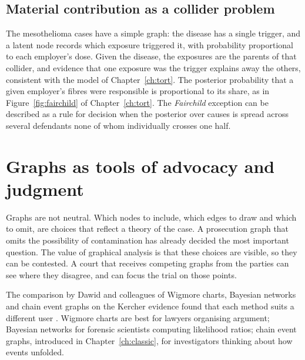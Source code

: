 \subsection{Material contribution as a collider problem}

The mesothelioma cases have a simple graph: the disease has a single trigger, and a latent node records which exposure triggered it, with probability proportional to each employer's dose. Given the disease, the exposures are the parents of that collider, and evidence that one exposure was the trigger explains away the others, consistent with the model of Chapter~\ref{ch:tort}. The posterior probability that a given employer's fibres were responsible is proportional to its share, as in Figure~\ref{fig:fairchild} of Chapter~\ref{ch:tort}. The \emph{Fairchild} exception can be described as a rule for decision when the posterior over causes is spread across several defendants none of whom individually crosses one half.

\section{Graphs as tools of advocacy and judgment}

Graphs are not neutral. Which nodes to include, which edges to draw and which to omit, are choices that reflect a theory of the case. A prosecution graph that omits the possibility of contamination has already decided the most important question. The value of graphical analysis is that these choices are visible, so they can be contested. A court that receives competing graphs from the parties can see where they disagree, and can focus the trial on those points.

The comparison by Dawid and colleagues of Wigmore charts, Bayesian networks and chain event graphs on the Kercher evidence found that each method suits a different user \citep{dawid2024kercher}. Wigmore charts are best for lawyers organising argument; Bayesian networks for forensic scientists computing likelihood ratios; chain event graphs, introduced in Chapter~\ref{ch:classic}, for investigators thinking about how events unfolded.

